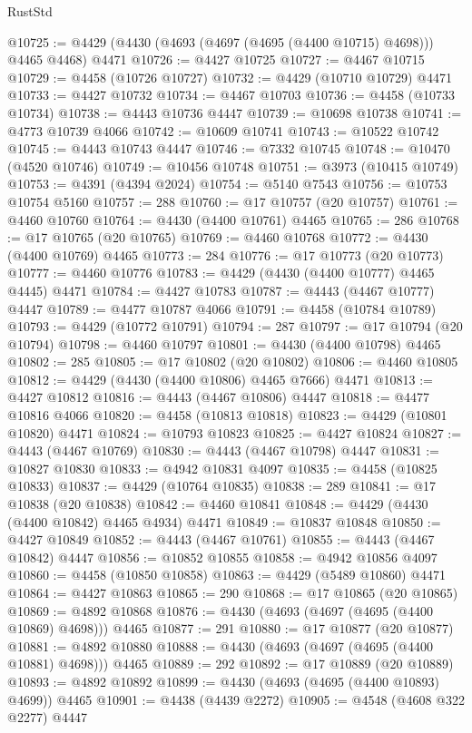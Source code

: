 \begin{lexlean}{RustStd}
\begin{coremodule}
{\begin{coremodule}
{{{{{{{{{{{{{{{{{{{{{{{{{{{{{{{{{{{{{{{{{{{{{{{{{{{{{{{{{{{{{{{{{{{{@10725 := @4429 (@4430 (@4693 (@4697 (@4695 (@4400 @10715) @4698))) @4465 @4468) @4471
@10726 := @4427 @10725
@10727 := @4467 @10715
@10729 := @4458 (@10726 @10727)
@10732 := @4429 (@10710 @10729) @4471
@10733 := @4427 @10732
@10734 := @4467 @10703
@10736 := @4458 (@10733 @10734)
@10738 := @4443 @10736 @4447
@10739 := @10698 @10738
@10741 := @4773 @10739 @4066
@10742 := @10609 @10741
@10743 := @10522 @10742
@10745 := @4443 @10743 @4447
@10746 := @7332 @10745
@10748 := @10470 (@4520 @10746)
@10749 := @10456 @10748
@10751 := @3973 (@10415 @10749)
@10753 := @4391 (@4394 @2024)
@10754 := @5140 @7543
@10756 := @10753 @10754 @5160
@10757 := 288
@10760 := @17 @10757 (@20 @10757)
@10761 := @4460 @10760
@10764 := @4430 (@4400 @10761) @4465
@10765 := 286
@10768 := @17 @10765 (@20 @10765)
@10769 := @4460 @10768
@10772 := @4430 (@4400 @10769) @4465
@10773 := 284
@10776 := @17 @10773 (@20 @10773)
@10777 := @4460 @10776
@10783 := @4429 (@4430 (@4400 @10777) @4465 @4445) @4471
@10784 := @4427 @10783
@10787 := @4443 (@4467 @10777) @4447
@10789 := @4477 @10787 @4066
@10791 := @4458 (@10784 @10789)
@10793 := @4429 (@10772 @10791)
@10794 := 287
@10797 := @17 @10794 (@20 @10794)
@10798 := @4460 @10797
@10801 := @4430 (@4400 @10798) @4465
@10802 := 285
@10805 := @17 @10802 (@20 @10802)
@10806 := @4460 @10805
@10812 := @4429 (@4430 (@4400 @10806) @4465 @7666) @4471
@10813 := @4427 @10812
@10816 := @4443 (@4467 @10806) @4447
@10818 := @4477 @10816 @4066
@10820 := @4458 (@10813 @10818)
@10823 := @4429 (@10801 @10820) @4471
@10824 := @10793 @10823
@10825 := @4427 @10824
@10827 := @4443 (@4467 @10769)
@10830 := @4443 (@4467 @10798) @4447
@10831 := @10827 @10830
@10833 := @4942 @10831 @4097
@10835 := @4458 (@10825 @10833)
@10837 := @4429 (@10764 @10835)
@10838 := 289
@10841 := @17 @10838 (@20 @10838)
@10842 := @4460 @10841
@10848 := @4429 (@4430 (@4400 @10842) @4465 @4934) @4471
@10849 := @10837 @10848
@10850 := @4427 @10849
@10852 := @4443 (@4467 @10761)
@10855 := @4443 (@4467 @10842) @4447
@10856 := @10852 @10855
@10858 := @4942 @10856 @4097
@10860 := @4458 (@10850 @10858)
@10863 := @4429 (@5489 @10860) @4471
@10864 := @4427 @10863
@10865 := 290
@10868 := @17 @10865 (@20 @10865)
@10869 := @4892 @10868
@10876 := @4430 (@4693 (@4697 (@4695 (@4400 @10869) @4698))) @4465
@10877 := 291
@10880 := @17 @10877 (@20 @10877)
@10881 := @4892 @10880
@10888 := @4430 (@4693 (@4697 (@4695 (@4400 @10881) @4698))) @4465
@10889 := 292
@10892 := @17 @10889 (@20 @10889)
@10893 := @4892 @10892
@10899 := @4430 (@4693 (@4695 (@4400 @10893) @4699)) @4465
@10901 := @4438 (@4439 @2272)
@10905 := @4548 (@4608 @322 @2277) @4447
}}}}}}}}}}}}}}}}}}}}}}}}}}}}}}}}}}}}}}}}}}}}}}}}}}}}}}}}}}}}}}}}}}}}
\end{coremodule}}
\end{coremodule}
\end{lexlean}
